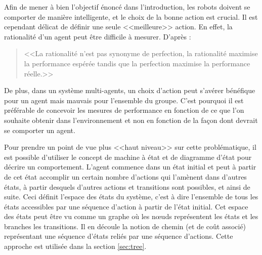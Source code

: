 Afin de mener à bien l'objectif énoncé dans l'introduction, les robots doivent se comporter de manière intelligente, et le choix de la bonne action est crucial. Il est cependant délicat de définir une seule <<meilleure>> action. En effet, la rationalité d'un agent peut être difficile à mesurer. D'après \cite{AIBrique}:
\begin{quote}
  <<La rationalité n'est pas synonyme de perfection, la rationalité maximise la performance espérée tandis que la perfection maximise la performance réelle.>>
\end{quote}

De plus, dans un système multi-agents, un choix d'action peut s'avérer bénéfique pour un agent mais mauvais pour l'ensemble du groupe. C'est pourquoi il est préférable de concevoir les mesures de performance en fonction de ce que l'on souhaite obtenir dans l'environnement et non en fonction de la façon dont devrait se comporter un agent.

Pour prendre un point de vue plus <<haut niveau>> sur cette problématique, il est possible d'utiliser le concept de machine à état et de diagramme d'état pour décrire un comportement. L'agent commence dans un état initial et peut à partir de cet état accomplir un certain nombre d'actions qui l'amènent dans d'autres états, à partir desquels d'autres actions et transitions sont possibles, et ainsi de suite. Ceci définit l'espace des états du système, c'est à dire l'ensemble de tous les états accessibles par une séquence d'action à partir de l'état initial. Cet espace des états peut être vu comme un graphe où les n\oe{}uds représentent les états et les branches les transitions. Il en découle la notion de chemin (et de coût associé) représentant une séquence d'états reliés par une séquence d'actions. Cette approche est utilisée dans la section \ref{sec:tree}.~\cite{foraging, AIBrique}

